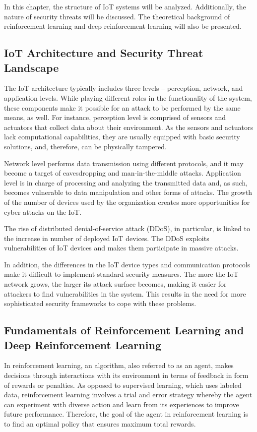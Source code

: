\documentclass[12pt]{article}
\begin{document}
In this chapter, the structure of IoT systems will be analyzed. Additionally, the nature of security threats will be discussed. The theoretical background of reinforcement learning and deep reinforcement learning will also be presented.
\subsection{IoT Architecture and Security Threat Landscape}
The IoT architecture typically includes three levels – perception, network, and application levels. While playing different roles in the functionality of the system, these components make it possible for an attack to be performed by the same means, as well. For instance, perception level is comprised of sensors and actuators that collect data about their environment. As the sensors and actuators lack computational capabilities, they are usually equipped with basic security solutions, and, therefore, can be physically tampered.\cite{shaikh}

Network level performs data transmission using different protocols, and it may become a target of eavesdropping and man-in-the-middle attacks. Application level is in charge of processing and analyzing the transmitted data and, as such, becomes vulnerable to data manipulation and other forms of attacks. The growth of the number of devices used by the organization creates more opportunities for cyber attacks on the IoT.

The rise of distributed denial-of-service attack (DDoS), in particular, is linked to the increase in number of deployed IoT devices. The DDoS exploits vulnerabilities of IoT devices and makes them participate in massive attacks.\cite{li}

In addition, the differences in the IoT device types and communication protocols make it difficult to implement standard security measures. The more the IoT network grows, the larger its attack surface becomes, making it easier for attackers to find vulnerabilities in the system. This results in the need for more sophisticated security frameworks to cope with these problems.
\subsection{Fundamentals of Reinforcement Learning and Deep Reinforcement Learning}
In reinforcement learning, an algorithm, also referred to as an agent, makes decisions through interactions with its environment in terms of feedback in form of rewards or penalties. As opposed to supervised learning, which uses labeled data, reinforcement learning involves a trial and error strategy whereby the agent can experiment with diverse action and learn from its experiences to improve future performance. Therefore, the goal of the agent in reinforcement learning is to find an optimal policy that ensures maximum total rewards.\cite{kheddar}
\end{document}
